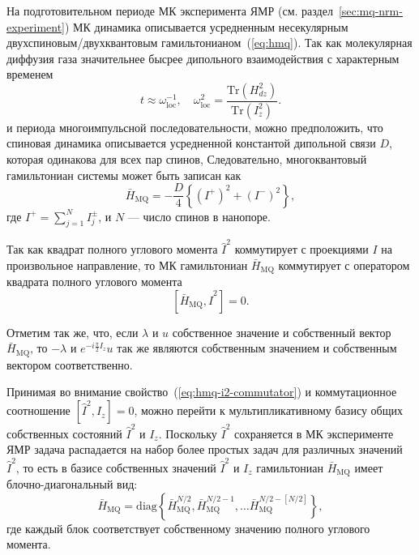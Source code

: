 На подготовительном периоде МК эксперимента ЯМР (см. раздел~\ref{sec:mq-nrm-experiment})
МК динамика описывается усредненным несекулярным двухспиновым/двухквантовым гамильтонианом~(\ref{eq:hmq}).
Так как молекулярная диффузия газа значительнее бысрее дипольного взаимодействия с характерным временем~\cite{Feldman2012}
%
\begin{equation}
  t \approx \omega^{-1}_\mathrm{loc},
  \quad
  \omega^2_\mathrm{loc} = \frac{\mathrm{Tr}(H^2_{dz})}{\mathrm{Tr}(I^2_z)}.
\end{equation}
%
и периода многоимпульсной последовательности,
можно предположить,
что спиновая динамика описывается усредненной константой дипольной связи $D$,
которая одинакова для всех пар спинов,
Следовательно, многоквантовый гамильтониан системы может быть записан как
\begin{equation}\label{eq:mq-hamiltoninan-equivalent-spins}
  \bar H_\mathrm{MQ} = - \dfrac{D}{4} \left\{
      \left( I^{+} \right)^2 + \left( I^{-} \right)^2
  \right\},
\end{equation}
где $I^{+} = \sum\limits_{j=1}^{N} I^{\pm}_j$,
и $N$ --- число спинов в нанопоре.

Так как квадрат полного углового момента $\hat I^2$ коммутирует с
проекциями $I$ на произвольное направление,
то МК гамильтониан $\bar H_\mathrm{MQ}$ коммутирует с оператором квадрата полного углового момента
\begin{equation}\label{eq:hmq-i2-commutator}
  \left[ \bar H_\mathrm{MQ}, \hat I^2 \right] = 0.
\end{equation}

Отметим так же,
что, если $\lambda$ и $u$ собственное значение и собственный вектор  $\bar H_\mathrm{MQ}$,
то $-\lambda$ и $e^{-i\frac{\pi}{2}I_z}u$
так же являются собственным значением и собственным вектором соответственно.

Принимая во внимание свойство~(\ref{eq:hmq-i2-commutator}) и коммутационное соотношение ${[\hat I^2, I_z] = 0}$,
можно перейти к мультипликативному базису общих собственных состояний $\hat I^2$ и $I_z$.
Поскольку $\hat I^2$ сохраняется в МК эксперименте ЯМР
задача распадается на набор более простых задач для различных значений $\hat I^2$,
то есть в базисе собственных значений  $\hat I^2$ и $I_z$
гамильтониан $\bar H_\mathrm{MQ}$ имеет блочно-диагональный вид:
\begin{equation}
  \bar H_\mathrm{MQ} = \mathrm{diag} \left\{
    \bar H_\mathrm{MQ}^{N/2},
    \bar H_\mathrm{MQ}^{N/2 - 1},
    \dots
    \bar H_\mathrm{MQ}^{N/2 - [N/2]}
  \right\},
\end{equation}
где каждый блок соответствует собственному значению полного углового момента.

